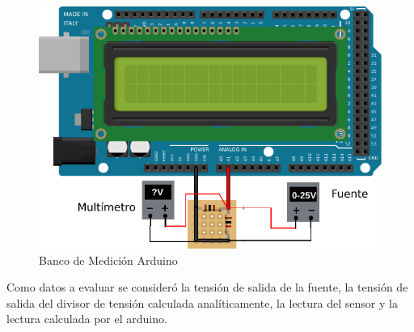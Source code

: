 \documentclass[12pt,a4paper]{article}
\begin{document}
			\begin{figure}[H]
			\centering
				\includegraphics[scale=1.2]{images/arduino2.pdf}\caption{Banco de Medición Arduino}
			\end{figure}

			Como datos a evaluar se consideró la tensión de salida de la fuente, la tensión de salida del divisor de tensión calculada analíticamente, la lectura del sensor y la lectura calculada por el arduino.
\end{document}
